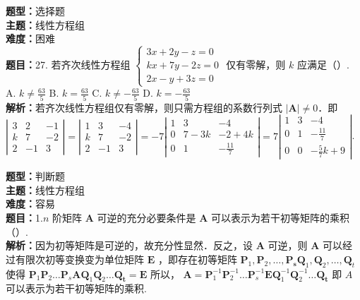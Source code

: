 \documentclass{ctexart}
\newenvironment{question}[5]{%
	\noindent\textbf{题型：}#1\\
	\textbf{主题：}#2\\
	\textbf{难度：}#3\\
	\textbf{题目：}#4\\
	\textbf{解析：}#5\\
	\vspace{1em}
}{}
\begin{document}
	\begin{question}
		{选择题}
		{线性方程组}
		{困难}
		{27. 若齐次线性方程组 \(\left\{\begin{array}{l}3 x+2 y-z=0 \\ k x+7 y-2 z=0 \\ 2 x-y+3 z=0\end{array}\right.\) 仅有零解，则 \(k\) 应满足（）.
			A. \(k \neq \frac{63}{5}\)
			B. \(k=\frac{63}{5}\)
			C. \(k \neq-\frac{63}{5}\)
			D. \(k=-\frac{63}{5}\)}
		{若齐次线性方程组仅有零解，则只需方程组的系数行列式 \(|\mathbf{A}| \neq 0\)．即 \(\left|\begin{array}{ccc}3 & 2 & -1 \\ k & 7 & -2 \\ 2 & -1 & 3\end{array}\right|=\left|\begin{array}{ccc}1 & 3 & -4 \\ k & 7 & -2 \\ 2 & -1 & 3\end{array}\right|=-7\left|\begin{array}{ccc}1 & 3 & -4 \\ 0 & 7-3 k & -2+4 k \\ 0 & 1 & -\frac{11}{7}\end{array}\right|=7\left|\begin{array}{ccc}1 & 3 & -4 \\ 0 & 1 & -\frac{11}{7} \\ 0 & 0 & -\frac{5}{7} k+9\end{array}\right|\).}
	\end{question}
	
	
	
	\begin{question}
		{判断题}
		{线性方程组}
		{容易}
		{1.\(n\) 阶矩阵 \(\mathbf{A}\) 可逆的充分必要条件是 \(\mathbf{A}\) 可以表示为若干初等矩阵的乘积（）.}
		{因为初等矩阵是可逆的，故充分性显然．反之，设 \(\mathbf{A}\) 可逆，则 \(\mathbf{A}\) 可以经过有限次初等变换变为单位矩阵 \(\mathbf{E}\) ，即存在初等矩阵 \(\mathbf{P}_1, \mathbf{P}_2, \ldots, \mathbf{P}_{\mathbf{s}} \mathbf{Q}_1, \mathbf{Q}_2, \ldots, \mathbf{Q}_t\) 使得 \(\mathbf{P}_1 \mathbf{P}_2 \ldots \mathbf{P}_s \mathbf{A} \mathbf{Q}_1 \mathbf{Q}_2 \ldots \mathbf{Q}_{\mathbf{t}}=\mathbf{E}\) 所以， \(\mathbf{A}=\mathbf{P}_1^{-1} \mathbf{P}_2^{-1} \ldots \mathbf{P}_s^{-1} \mathbf{E} \mathbf{Q}_1^{-1} \mathbf{Q}_2^{-1} \ldots \mathbf{Q}_{\mathbf{t}}\) 即 \(A\) 可以表示为若干初等矩阵的乘积.}
	\end{question}
	
\end{document}
